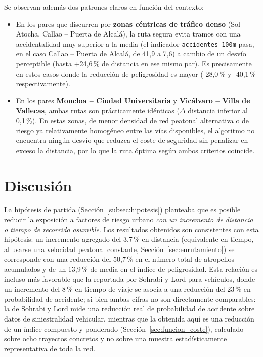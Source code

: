 Se observan además dos patrones claros en función del contexto:

\begin{itemize}
    \item En los pares que discurren por \textbf{zonas céntricas de tráfico denso} (Sol -- Atocha, Callao -- Puerta de Alcalá), la ruta segura evita tramos con una accidentalidad muy superior a la media (el indicador \texttt{accidentes\_100m} pasa, en el caso Callao -- Puerta de Alcalá, de 41,9 a 7,6) a cambio de un desvío perceptible (hasta +24,6\,\% de distancia en ese mismo par). Es precisamente en estos casos donde la reducción de peligrosidad es mayor (-28,0\,\% y -40,1\,\% respectivamente).
    \item En los pares \textbf{Moncloa -- Ciudad Universitaria} y \textbf{Vicálvaro -- Villa de Vallecas}, ambas rutas son prácticamente idénticas ($\Delta$ distancia inferior al 0,1\,\%). En estas zonas, de menor densidad de red peatonal alternativa o de riesgo ya relativamente homogéneo entre las vías disponibles, el algoritmo no encuentra ningún desvío que reduzca el coste de seguridad sin penalizar en exceso la distancia, por lo que la ruta óptima según ambos criterios coincide.
\end{itemize}

\section{Discusión}
\label{sec:discusion_resultados}

La hipótesis de partida (Sección~\ref{subsec:hipotesis}) planteaba que es posible reducir la exposición a factores de riesgo urbano \textit{con un incremento de distancia o tiempo de recorrido asumible}. Los resultados obtenidos son consistentes con esta hipótesis: un incremento agregado del 3,7\,\% en distancia (equivalente en tiempo, al usarse una velocidad peatonal constante, Sección~\ref{sec:enrutamiento}) se corresponde con una reducción del 50,7\,\% en el número total de atropellos acumulados y de un 13,9\,\% de media en el índice de peligrosidad. Esta relación es incluso más favorable que la reportada por Sohrabi y Lord \cite{sohrabilord2022} para vehículos, donde un incremento del 8\,\% en tiempo de viaje se asocia a una reducción del 23\,\% en probabilidad de accidente; si bien ambas cifras no son directamente comparables: la de Sohrabi y Lord mide una reducción real de probabilidad de accidente sobre datos de siniestralidad vehicular, mientras que la obtenida aquí es una reducción de un índice compuesto y ponderado (Sección~\ref{sec:funcion_coste}), calculado sobre ocho trayectos concretos y no sobre una muestra estadísticamente representativa de toda la red.


